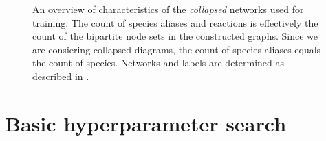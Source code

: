\documentclass[
	fontsize=10pt, %
	twoside=false, %
	secnumdepth=1, %
  toc=indentunnumbered %
]{kaobook}
\begin{document}
\begin{figure}[h]
\begin{subfigure}{0.32\textwidth}
  \end{subfigure} 
  \caption[
  An overview of characteristics of networks used for training.
  ]{ An overview of characteristics of the \textit{collapsed} networks
    used for training. The count of species aliases and reactions is effectively
    the count of the bipartite node sets in the constructed graphs. Since we are
    consiering collapsed diagrams, the count of species aliases equals the count
    of species.
    Networks and labels are determined as described in
    . }
  \label{fig:maps-summary}
\end{figure}
















\section{Basic hyperparameter search}
\end{document}
